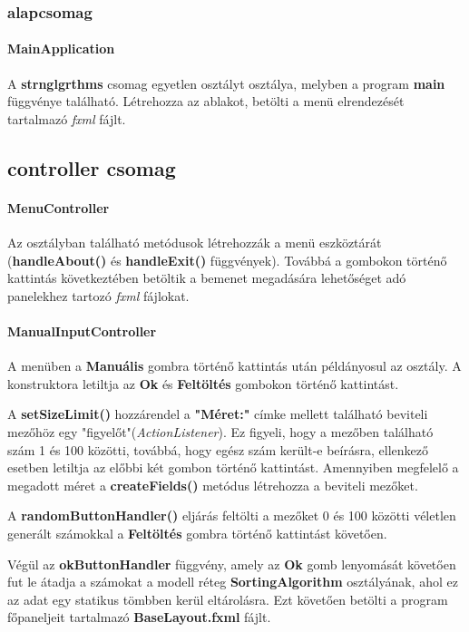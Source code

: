 \documentclass{elteikthesis}
\begin{document}
\subsubsection{alapcsomag}
\paragraph{MainApplication}
A \textbf{strnglgrthms} csomag egyetlen osztályt osztálya, melyben a program \textbf{main} függvénye található. Létrehozza az ablakot, betölti a menü elrendezését tartalmazó \emph{fxml} fájlt.
\subsection{controller csomag}
\paragraph{MenuController}
Az osztályban található metódusok létrehozzák a menü eszköztárát (\textbf{handleAbout()} és \textbf{handleExit()} függvények). Továbbá a gombokon történő kattintás következtében betöltik a bemenet megadására lehetőséget adó panelekhez tartozó \emph{fxml} fájlokat.
\paragraph{ManualInputController}
A menüben a \textbf{Manuális} gombra történő kattintás után példányosul az osztály. A konstruktora letiltja az \textbf{Ok} és \textbf{Feltöltés} gombokon történő kattintást.\par
A \textbf{setSizeLimit()} hozzárendel a \textbf{"Méret:"} címke mellett található beviteli mezőhöz egy "figyelőt"(\emph{ActionListener}). Ez figyeli, hogy a mezőben található szám 1 és 100 közötti, továbbá, hogy egész szám került-e beírásra, ellenkező esetben letiltja az előbbi két gombon történő kattintást. Amennyiben megfelelő a megadott méret a \textbf{createFields()} metódus létrehozza a beviteli mezőket.\par A \textbf{randomButtonHandler()} eljárás feltölti a mezőket 0 és 100 közötti véletlen generált számokkal a \textbf{Feltöltés} gombra történő kattintást követően. 
\par Végül az \textbf{okButtonHandler} függvény, amely az \textbf{Ok} gomb lenyomását követően fut le átadja a számokat a modell réteg \textbf{SortingAlgorithm} osztályának, ahol ez az adat egy statikus tömbben kerül eltárolásra. Ezt követően betölti a program főpaneljeit tartalmazó \textbf{BaseLayout.fxml} fájlt.
\end{document}
